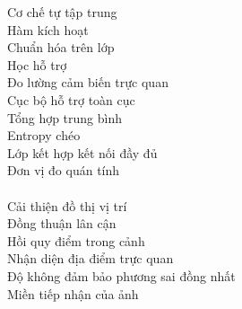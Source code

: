 \begin{keyword}
                    {Cơ chế tự tập trung}           \\
               {Hàm kích hoạt}                 \\
               {Chuẩn hóa trên lớp}            \\
                {Học hỗ trợ}                    \\
                   {Đo lường cảm biến trực quan}   \\
              {Cục bộ hỗ trợ toàn cục}        \\
                   {Tổng hợp trung bình}           \\
                     {Entropy chéo}                  \\
      {Lớp kết hợp kết nối đầy đủ}    \\
         {Đơn vị đo quán tính}           \\
      \\
           {Cải thiện đồ thị vị trí}       \\
            {Đồng thuận lân cận}	 		\\ 
            {Hồi quy điểm trong cảnh} 		\\
          {Nhận diện địa điểm trực quan} 	\\
         {Độ không đảm bảo phương sai đồng nhất} \\
                   {Miền tiếp nhận của ảnh}		\\
\end{keyword}

